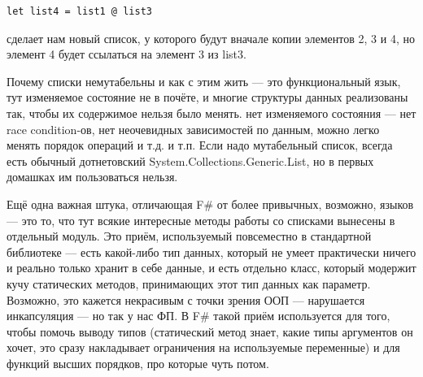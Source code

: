 \documentclass[a5paper]{article}
\begin{document}
\begin{verbatim}
let list4 = list1 @ list3
\end{verbatim}

сделает нам новый список, у которого будут вначале копии элементов 2, 3 и 4, но элемент 4 будет ссылаться на элемент 3 из list3.

Почему списки немутабельны и как с этим жить --- это функциональный язык, тут изменяемое состояние не в почёте, и многие структуры данных реализованы так, чтобы их содержимое нельзя было менять. нет изменяемого состояния --- нет race condition-ов, нет неочевидных зависимостей по данным, можно легко менять порядок операций и т.д. и т.п. Если надо мутабельный список, всегда есть обычный дотнетовский System.Collections.Generic.List, но в первых домашках им пользоваться нельзя.

Ещё одна важная штука, отличающая F\# от более привычных, возможно, языков --- это то, что тут всякие интересные методы работы со списками вынесены в отдельный модуль. Это приём, используемый повсеместно в стандартной библиотеке --- есть какой-либо тип данных, который не умеет практически ничего и реально только хранит в себе данные, и есть отдельно класс, который модержит кучу статических методов, принимающих этот тип данных как параметр. Возможно, это кажется некрасивым с точки зрения ООП --- нарушается инкапсуляция --- но так у нас ФП. В F\# такой приём используется для того, чтобы помочь выводу типов (статический метод знает, какие типы аргументов он хочет, это сразу накладывает ограничения на используемые переменные) и для функций высших порядков, про которые чуть потом.
\end{document}
